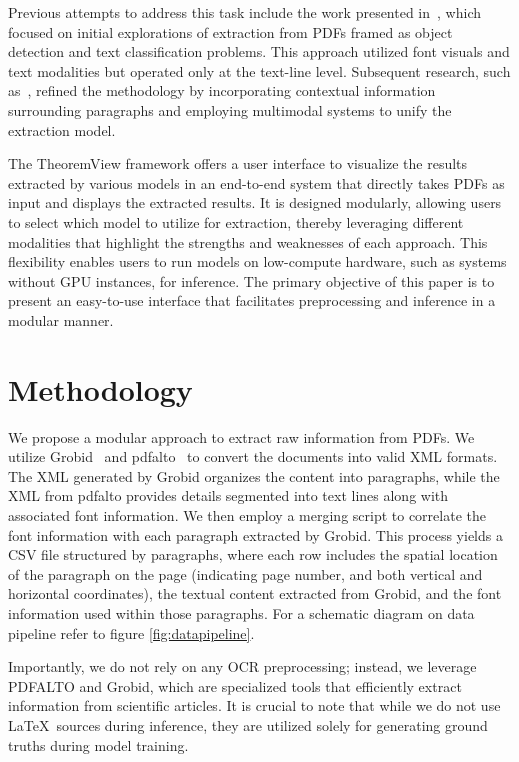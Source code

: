 \documentclass[runningheads]{llncs}
\begin{document}
Previous attempts to address this task include the work presented in~\cite{doceng_paper}, which focused on 
initial explorations of extraction from PDFs framed as object detection and text classification problems. 
This approach utilized font visuals and text modalities but operated only at the text-line level. Subsequent 
research, such as~\cite{jcdl_paper}, refined the methodology by incorporating contextual information 
surrounding paragraphs and employing multimodal systems to unify the extraction model.

The TheoremView framework offers a user interface to visualize the results extracted by various models in 
an end-to-end system that directly takes PDFs as input and displays the extracted results. It is designed 
modularly, allowing users to select which model to utilize for extraction, thereby leveraging different 
modalities that highlight the strengths and weaknesses of each approach. This flexibility enables users 
to run models on low-compute hardware, such as systems without GPU instances, for inference. The primary 
objective of this paper is to present an easy-to-use interface that facilitates preprocessing and inference 
in a modular manner.

\section{Methodology}
We propose a modular approach to extract raw information from PDFs. We utilize Grobid~\cite{GROBID} and pdfalto~\cite{pdfalto} to convert 
the documents into valid XML formats. The XML generated by Grobid organizes the content into paragraphs, 
while the XML from pdfalto provides details segmented into text lines along with associated font information. 
We then employ a merging script to correlate the font information with each paragraph extracted by Grobid. 
This process yields a CSV file structured by paragraphs, where each row includes the spatial location of the 
paragraph on the page (indicating page number, and both vertical and horizontal coordinates), the textual content 
extracted from Grobid, and the font information used within those paragraphs. For a schematic diagram on data pipeline
refer to figure \ref{fig:datapipeline}.

Importantly, we do not rely on any OCR preprocessing; instead, we leverage PDFALTO and Grobid, which are 
specialized tools that efficiently extract information from scientific articles. It is crucial to note that 
while we do not use \LaTeX~sources during inference, they are utilized solely for generating ground truths 
during model training.
\end{document}
